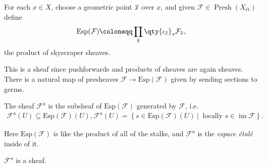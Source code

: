 \begin{definition}

For each \(x\in X\), choose a geometric point
\(\mkern 1.5mu\overline{\mkern-1.5mux\mkern-1.5mu}\mkern 1.5mu\) over
\(x\), and given
\(\mathcal{F}\in {\operatorname{Presh}}(X_{\text{ét}})\) define
\begin{align*}  
\mathrm{Esp}(\mathcal{F}) \coloneqq\prod_{\mkern 1.5mu\overline{\mkern-1.5mux\mkern-1.5mu}\mkern 1.5mu} \qty{\iota_{\mkern 1.5mu\overline{\mkern-1.5mux\mkern-1.5mu}\mkern 1.5mu}}_* \mathcal{F}_{\mkern 1.5mu\overline{\mkern-1.5mux\mkern-1.5mu}\mkern 1.5mu}
,\end{align*}
the product of skyscraper sheaves.

\end{definition}

\begin{remark}

This is a sheaf since pushforwards and products of sheaves are again
sheaves. There is a natural map of presheaves
\(\mathcal{F}\to \mathrm{Esp}(\mathcal{F})\) given by sending sections
to germs.

\end{remark}

\begin{definition}

The sheaf \(\mathcal{F}^a\) is the subsheaf of
\(\mathrm{Esp}(\mathcal{F})\) generated by \(\mathcal{F}\), i.e.
\begin{align*}  
\mathcal{F}^a(U) \subseteq \mathrm{Esp}(\mathcal{F})(U), \mathcal{F}^a(U) = \left\{{s\in \mathrm{Esp}(\mathcal{F})(U)  {~\mathrel{\Big|}~}\text{ locally } s\in \operatorname{im}\mathcal{F}}\right\}
.\end{align*}

\end{definition}

\begin{remark}

Here \(\mathrm{Esp}(\mathcal{F})\) is like the product of all of the
stalks, and \(\mathcal{F}^a\) is the \emph{espace étalé} inside of it.

\end{remark}

\begin{proposition}[?]

\(\mathcal{F}^a\) is a sheaf.

\end{proposition}

